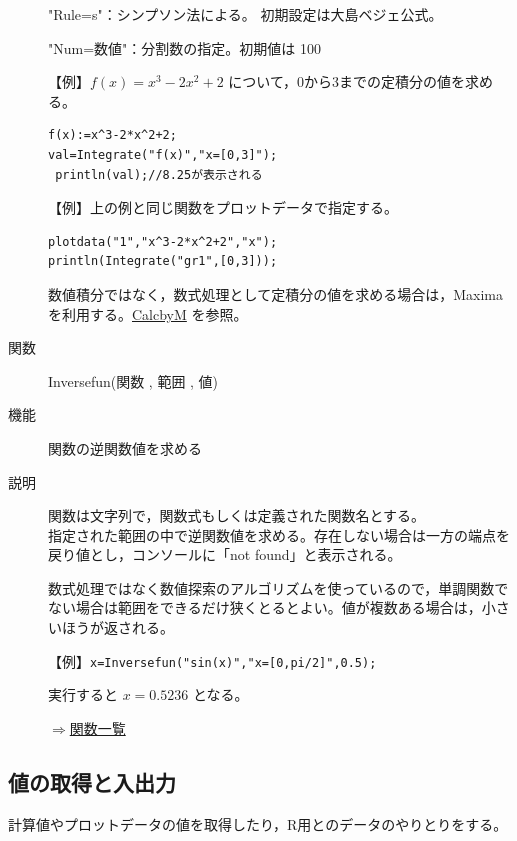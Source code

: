 \documentclass[papersize,a4paper,10pt,uplatex]{jsarticle}
\begin{document}
\begin{description}
"Rule=s"：シンプソン法による。 初期設定は大島ベジェ公式。

"Num=数値"：分割数の指定。初期値は 100 

\vspace{\baselineskip}
【例】$f(x)=x^3-2x^2+2$ について，0から3までの定積分の値を求める。
\begin{verbatim}
f(x):=x^3-2*x^2+2;
val=Integrate("f(x)","x=[0,3]");
 println(val);//8.25が表示される
\end{verbatim}

\vspace{\baselineskip}
【例】上の例と同じ関数をプロットデータで指定する。
\begin{verbatim}
plotdata("1","x^3-2*x^2+2","x");
println(Integrate("gr1",[0,3]));
\end{verbatim}

数値積分ではなく，数式処理として定積分の値を求める場合は，Maxima を利用する。\hyperlink{calcbyM}{CalcbyM}
を参照。

\vspace{\baselineskip}
\hypertarget{inversefun}{}
\item[関数]Inversefun(関数 , 範囲 , 値)
\item[機能]関数の逆関数値を求める
\item[説明]関数は文字列で，関数式もしくは定義された関数名とする。\\
指定された範囲の中で逆関数値を求める。存在しない場合は一方の端点を戻り値とし，コンソールに「not found」と表示される。

数式処理ではなく数値探索のアルゴリズムを使っているので，単調関数でない場合は範囲をできるだけ狭くとるとよい。値が複数ある場合は，小さいほうが返される。


\vspace{\baselineskip}
【例】\verb|x=Inversefun("sin(x)","x=[0,pi/2]",0.5);|

実行すると $x=0.5236$ となる。
\begin{flushright}\hyperlink{functionlist}{$\Rightarrow$関数一覧}\end{flushright}

\end{description}

\subsection{値の取得と入出力}

計算値やプロットデータの値を取得したり，R用とのデータのやりとりをする。
\end{document}
